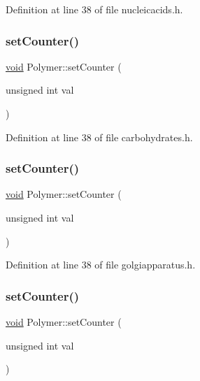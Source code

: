 Definition at line 38 of file nucleicacids.\+h.

\mbox{\label{class_polymer_a7ed6bbe09a570b59f9253d63fd3326d2}} 
\subsubsection{\texorpdfstring{set\+Counter()}{setCounter()}\hspace{0.1cm}{\footnotesize\ttfamily [8/10]}}
{\footnotesize\ttfamily \mbox{\hyperlink{glad_8h_a950fc91edb4504f62f1c577bf4727c29}{void}} Polymer\+::set\+Counter (\begin{DoxyParamCaption}\item[{unsigned int}]{val }\end{DoxyParamCaption})\hspace{0.3cm}{\ttfamily [inline]}}



Definition at line 38 of file carbohydrates.\+h.

\mbox{\label{class_polymer_a7ed6bbe09a570b59f9253d63fd3326d2}} 
\subsubsection{\texorpdfstring{set\+Counter()}{setCounter()}\hspace{0.1cm}{\footnotesize\ttfamily [9/10]}}
{\footnotesize\ttfamily \mbox{\hyperlink{glad_8h_a950fc91edb4504f62f1c577bf4727c29}{void}} Polymer\+::set\+Counter (\begin{DoxyParamCaption}\item[{unsigned int}]{val }\end{DoxyParamCaption})\hspace{0.3cm}{\ttfamily [inline]}}



Definition at line 38 of file golgiapparatus.\+h.

\mbox{\label{class_polymer_a7ed6bbe09a570b59f9253d63fd3326d2}} 
\subsubsection{\texorpdfstring{set\+Counter()}{setCounter()}\hspace{0.1cm}{\footnotesize\ttfamily [10/10]}}
{\footnotesize\ttfamily \mbox{\hyperlink{glad_8h_a950fc91edb4504f62f1c577bf4727c29}{void}} Polymer\+::set\+Counter (\begin{DoxyParamCaption}\item[{unsigned int}]{val }\end{DoxyParamCaption})\hspace{0.3cm}{\ttfamily [inline]}}



